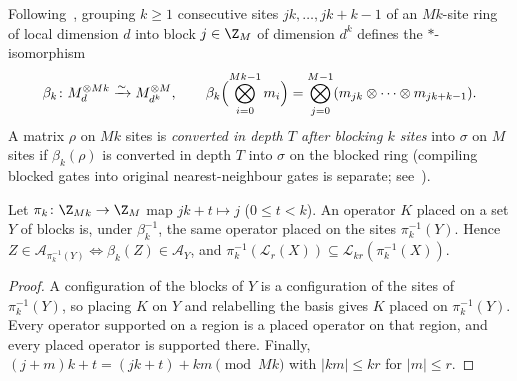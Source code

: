 \begin{definition}
    \label{def:qc_blocked_local_channel_conversion}
    \leanok
    Following~\cite{Piroli2021LOCC}, grouping $k\ge1$ consecutive sites $jk,\dots,jk+k-1$ of an $Mk$-site ring of local dimension $d$ into block $j\in\Z_M$ of dimension $d^k$ defines the $*$-isomorphism
    \begin{align}
        \beta_k\colon M_d^{\otimes Mk}\xrightarrow{\sim} M_{d^k}^{\otimes M},\qquad
        \beta_k\Bigl(\bigotimes_{i=0}^{Mk-1}m_i\Bigr)=\bigotimes_{j=0}^{M-1}(m_{jk}\otimes\cdots\otimes m_{jk+k-1}).\notag
    \end{align}
    A matrix $\rho$ on $Mk$ sites is \emph{converted in depth $T$ after blocking $k$ sites} into $\sigma$ on $M$ sites if $\beta_k(\rho)$ is converted in depth $T$ into $\sigma$ on the blocked ring (compiling blocked gates into original nearest-neighbour gates is separate; see~\cite{gap:psc21_local_channel_phase_scope}).
\end{definition}

\begin{lemma}
    \label{lem:qc_blocking_supports}
    \leanok
    Let $\pi_k\colon\Z_{Mk}\to\Z_M$ map $jk+t\mapsto j$ ($0\le t<k$). An operator $K$ placed on a
    set $Y$ of blocks is, under $\beta_k^{-1}$, the same operator placed on the sites
    $\pi_k^{-1}(Y)$. Hence $Z\in\mathcal A_{\pi_k^{-1}(Y)}\iff\beta_k(Z)\in\mathcal A_Y$, and
    $\pi_k^{-1}(\mathcal L_r(X))\subseteq\mathcal L_{kr}(\pi_k^{-1}(X))$.
\end{lemma}
\begin{proof}
    \leanok
    A configuration of the blocks of $Y$ is a configuration of the sites of $\pi_k^{-1}(Y)$, so
    placing $K$ on $Y$ and relabelling the basis gives $K$ placed on $\pi_k^{-1}(Y)$. Every
    operator supported on a region is a placed operator on that region, and every placed operator
    is supported there. Finally, $(j+m)k+t=(jk+t)+km\pmod{Mk}$ with $|km|\le kr$ for $|m|\le r$.
\end{proof}

